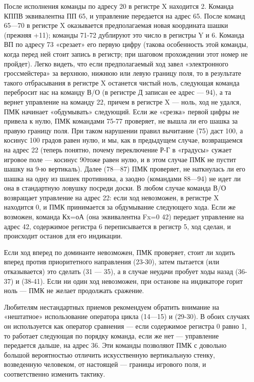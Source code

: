 \documentclass[11pt,a4paper,oneside]{article}
\begin{document}
После исполнения команды по адресу 20 в регистре X находится 2. Команда КППВ эквивалентна ПП 65, и управление передается на адрес 65. После команд 65—70 в регистре X оказывается предполагаемая новая координата шашки (прежняя +11); команды 71-72 дублируют это число в регистры Y и 6. Команда ВП по адресу 73 «срезает» его первую цифру (такова особенность этой команды, когда перед ней стоит запись в регистр; при шаговом прохождении этот номер не пройдет). Легко видеть, что если предполагаемый ход завел «электронного гроссмейстера» за верхнюю, нижнюю или левую границу поля, то в результате такого отбрасывания в регистре X останется чистый ноль, следующая команда перебросит нас на команду В/О (в регистре Д записан ее адрес — 94), а та вернет управление на команду 22, причем в регистре X — ноль, ход не удался, ПМК начинает «обдумывать» следующий. Если же «срезка» первой цифры не привела к нулю, ПМК командами 75-77 проверяет, не вышла ли его шашка за правую границу поля. При таком нарушении правил вычитание (75) даст 100, а косинус 100 градов равен нулю, и мы, как в предыдущем случае, возвращаемся на адрес 22 (теперь понятно, почему переключение Р-Г в «градусы» сужает игровое поле — косинус 90\degree тоже равен нулю, и в этом случае ПМК не пустит шашку на 9-ю вертикаль). Далее (78—87) ПМК проверяет, не наткнулась ли его шашка на одну из шашек противника, а заодно (командами 88—94) не идет ли она в стандартную ловушку посреди доски. В любом случае команда В/О возвращает управление на адрес 22: если ход невозможен, в регистре X находится 0, и ПМК принимается за обдумывание следующего хода. Если же возможен, команда Кх=оА (она эквивалентна Fx=0 42) передает управление на адрес 42, содержимое регистра 6 переписывается в регистр 5, ход сделан, и происходит останов для его индикации.

Если ход вперед по доминанте невозможен, ПМК проверяет, стоит ли ходить вперед против приоритетного направления (23-30), затем пытается (или отказывается) это сделать (31 — 35), а в случае неудачи пробует ходы назад (36-37) и (38-41). Если ни один ход невозможен, при останове на индикаторе горит ноль — ПМК не желает продолжать сражение.

Любителям нестандартных приемов рекомендуем обратить внимание на «нештатное» использование оператора цикла (14—15) и (29-30). В обоих случаях он используется как оператор сравнения — если содержимое регистра 0 равно 1, то работает следующая по порядку команда, если же нет — управление передается дальше, на адрес 36. Эти команды позволяют ПМК с довольно большой вероятностью отличить искусственную вертикальную стенку, возведенную человеком, от настоящей — границы игрового поля, и соответственно изменить тактику.
\end{document}
